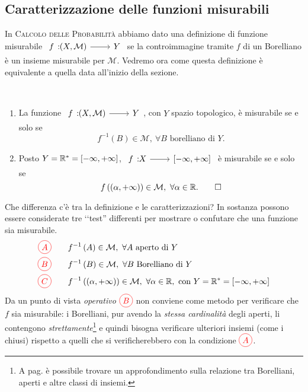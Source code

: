 \subsection{Caratterizzazione delle funzioni misurabili}
In \textsc{Calcolo delle Probabilità} abbiamo dato una definizione di funzione misurabile $\funz{f}{\left(X,\mathcal{M}\right)}{Y}$ se la controimmagine tramite $f$ di un Borelliano è un insieme misurabile per $\mathcal{M}$. Vedremo ora come questa definizione è equivalente a quella data all'inizio della sezione.
\begin{theoremasqed}~
	\begin{enumerate}\label{caratterizzazionefunzionimisurabili}
		\item La funzione $\funz{f}{\left(X,\mathcal{M}\right)}{Y}$, con $Y$ spazio topologico, è  misurabile se e solo se
		\begin{equation}
			f^{-1}\left(B\right)\in\mathcal{M},\ \forall B \text{ borelliano di } Y.
		\end{equation}
		\item Posto $Y=\mathbb{R}^{\ast}=\left[-\infty,+\infty\right]$, $\funz{f}{X}{\left[-\infty,+\infty\right]}$ è misurabile se e solo se
		\begin{equation}
			f\left(\left(\alpha,+\infty\right)\right)\in\mathcal{M},\ \forall \alpha\in\realset.\qedhere
		\end{equation}
	\end{enumerate}
\end{theoremasqed}
Che differenza c'è tra la definizione e le caratterizzazioni? In sostanza possono essere considerate tre ‘‘test'' differenti per mostrare o confutare che una funzione sia misurabile.
\begin{align*}
	\textcolor{red}{\circled{A}}&\qquad f^{-1}\left(A\right)\in\mathcal{M},\ \forall A\text{ aperto di }Y\\
	\textcolor{red}{\circled{B}}&\qquad f^{-1}\left(B\right)\in\mathcal{M},\ \forall B\text{ Borelliano di }Y\\
	\textcolor{red}{\circled{C}}&\qquad f^{-1}\left(\left(\alpha,+\infty\right)\right)\in\mathcal{M},\ \forall \alpha\in\realset,\ \text{con }Y=\realset^{\ast}=\left[-\infty,+\infty\right]
\end{align*}
Da un punto di vista \textit{operativo} $\textcolor{red}{\circled{B}}$ non conviene come metodo per verificare che $f$ sia misurabile: i Borelliani, pur avendo la \textit{stessa cardinalità} degli aperti, li contengono \textit{strettamente}\footnote{A pag. \pageref{famigliediinsiemi} è possibile trovare un approfondimento sulla relazione tra Borelliani, aperti e altre classi di insiemi.} e quindi bisogna verificare ulteriori insiemi (come i chiusi) rispetto a quelli che si verificherebbero con la condizione $\textcolor{red}{\circled{A}}$.\\
